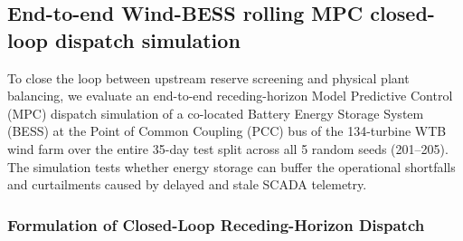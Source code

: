 \documentclass[
  journal]{IEEEtran}
\begin{document}
\FloatBarrier

\subsection*{End-to-end Wind-BESS rolling MPC closed-loop dispatch
simulation}\label{end-to-end-wind-bess-rolling-mpc-closed-loop-dispatch-simulation}

To close the loop between upstream reserve screening and physical plant
balancing, we evaluate an end-to-end receding-horizon Model Predictive
Control (MPC) dispatch simulation of a co-located Battery Energy Storage
System (BESS) at the Point of Common Coupling (PCC) bus of the
134-turbine WTB wind farm over the entire 35-day test split across all 5
random seeds (201--205). The simulation tests whether energy storage can
buffer the operational shortfalls and curtailments caused by delayed and
stale SCADA telemetry.

\subsubsection*{Formulation of Closed-Loop Receding-Horizon
Dispatch}\label{formulation-of-closed-loop-receding-horizon-dispatch}
\end{document}
